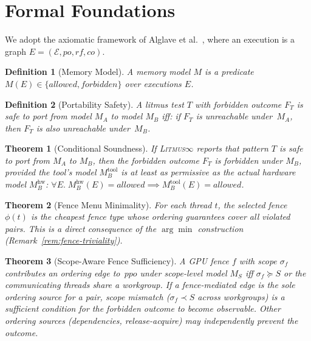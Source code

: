 \documentclass[11pt]{article}
\newcommand{\litmus}{\textsc{Litmus$\infty$}}
\newtheorem{theorem}{Theorem}
\newtheorem{definition}{Definition}
\begin{document}
\section{Formal Foundations}
\label{app:formal}

We adopt the axiomatic framework of Alglave et al.~\cite{Alglave2014},
where an execution is a graph
$E = (\mathcal{E}, \mathit{po}, \mathit{rf}, \mathit{co})$.

\begin{definition}[Memory Model]
A memory model $M$ is a predicate $M(E) \in \{\mathit{allowed},
\mathit{forbidden}\}$ over executions $E$.
\end{definition}

\begin{definition}[Portability Safety]
\label{def:portsafe}
A litmus test $T$ with forbidden outcome $F_T$ is \emph{safe}
to port from model $M_A$ to model $M_B$ iff: if $F_T$ is
unreachable under~$M_A$, then $F_T$ is also unreachable under~$M_B$.
\end{definition}

\begin{theorem}[Conditional Soundness]
\label{thm:soundness}
If \litmus{} reports that pattern $T$ is safe to port from $M_A$ to
$M_B$, then the forbidden outcome $F_T$ is forbidden under $M_B$,
\emph{provided the tool's model $M_B^{\mathrm{tool}}$ is at least
as permissive as the actual hardware model $M_B^{\mathrm{hw}}$}:
$\forall E.\; M_B^{\mathrm{hw}}(E) = \mathit{allowed} \implies
M_B^{\mathrm{tool}}(E) = \mathit{allowed}$.
\end{theorem}

\begin{theorem}[Fence Menu Minimality]
\label{thm:fence-min}
For each thread $t$, the selected fence $\phi(t)$ is the cheapest
fence type whose ordering guarantees cover all violated pairs.
This is a direct consequence of the $\arg\min$ construction
(Remark~\ref{rem:fence-triviality}).
\end{theorem}

\begin{theorem}[Scope-Aware Fence Sufficiency]
\label{thm:scope-fence}
A GPU fence $f$ with scope $\sigma_f$ contributes an ordering edge
to~$\mathit{ppo}$ under scope-level model $M_S$ iff $\sigma_f \succeq S$
or the communicating threads share a workgroup.
If a fence-mediated edge is the sole ordering source for a pair,
scope mismatch ($\sigma_f \prec S$ across workgroups) is a
\emph{sufficient condition} for the forbidden outcome to become
observable. Other ordering sources (dependencies, release-acquire)
may independently prevent the outcome.
\end{theorem}
\end{document}
